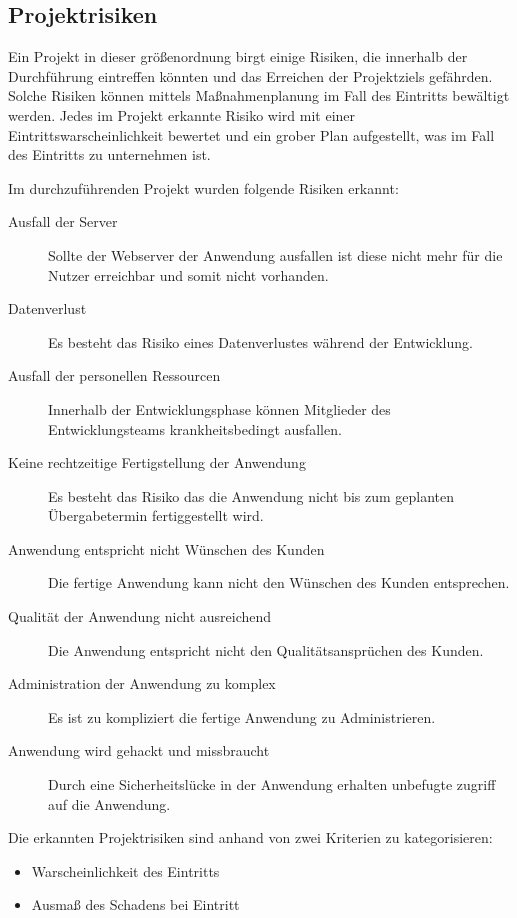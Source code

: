 \subsection{Projektrisiken}
\label{sec:Projektrisiken}


Ein Projekt in dieser größenordnung birgt einige Risiken, die innerhalb der
Durchführung eintreffen könnten und das Erreichen der Projektziels gefährden.
Solche Risiken können mittels Maßnahmenplanung im Fall des Eintritts bewältigt
werden. Jedes im Projekt erkannte Risiko wird mit einer
Eintrittswarscheinlichkeit bewertet und ein grober Plan aufgestellt, was im Fall
des Eintritts zu unternehmen ist.

Im durchzuführenden Projekt wurden folgende Risiken erkannt:

\begin{description}
\item[Ausfall der Server]
Sollte der Webserver der Anwendung ausfallen ist diese nicht mehr für die Nutzer
erreichbar und somit nicht vorhanden.
\item[Datenverlust]
Es besteht das Risiko eines Datenverlustes während der Entwicklung.
\item[Ausfall der personellen Ressourcen]
Innerhalb der Entwicklungsphase können Mitglieder des Entwicklungsteams
krankheitsbedingt ausfallen.
\item[Keine rechtzeitige Fertigstellung der Anwendung]
Es besteht das Risiko das die Anwendung nicht bis zum geplanten Übergabetermin
fertiggestellt wird.
\item[Anwendung entspricht nicht Wünschen des Kunden]
Die fertige Anwendung kann nicht den Wünschen des Kunden entsprechen.
\item[Qualität der Anwendung nicht ausreichend]
Die Anwendung entspricht nicht den Qualitätsansprüchen des Kunden.
\item[Administration der Anwendung zu komplex]
Es ist zu kompliziert die fertige Anwendung zu Administrieren.
\item[Anwendung wird gehackt und missbraucht]
Durch eine Sicherheitslücke in der Anwendung erhalten unbefugte zugriff auf die
Anwendung. 
\end{description}

Die erkannten Projektrisiken sind anhand von zwei Kriterien zu kategorisieren:

\begin{itemize}
\item Warscheinlichkeit des Eintritts
\item Ausmaß des Schadens bei Eintritt 
\end{itemize}

